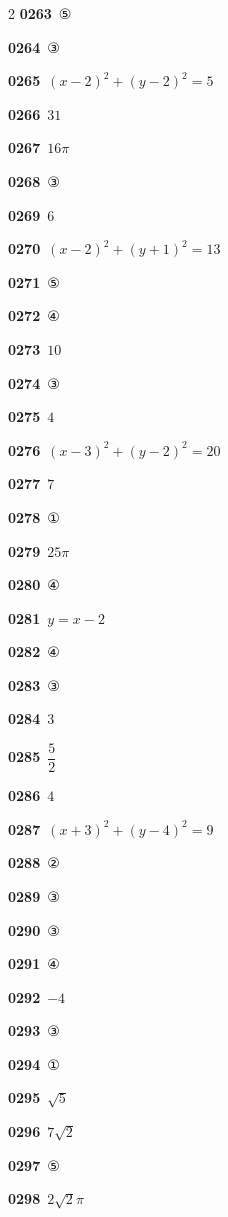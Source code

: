 \documentclass[10pt,a4paper]{article}
\begin{document}
\begin{multicols}{2}
\noindent\textbf{0263}\ ⑤\par
\noindent\textbf{0264}\ ③\par
\noindent\textbf{0265}\ $(x-2)^2+(y-2)^2=5$\par
\noindent\textbf{0266}\ $31$\par
\noindent\textbf{0267}\ $16\pi$\par
\noindent\textbf{0268}\ ③\par
\noindent\textbf{0269}\ $6$\par
\noindent\textbf{0270}\ $(x-2)^2+(y+1)^2=13$\par
\noindent\textbf{0271}\ ⑤\par
\noindent\textbf{0272}\ ④\par
\noindent\textbf{0273}\ $10$\par
\noindent\textbf{0274}\ ③\par
\noindent\textbf{0275}\ $4$\par
\noindent\textbf{0276}\ $(x-3)^2+(y-2)^2=20$\par
\noindent\textbf{0277}\ $7$\par
\noindent\textbf{0278}\ ①\par
\noindent\textbf{0279}\ $25\pi$\par
\noindent\textbf{0280}\ ④\par
\noindent\textbf{0281}\ $y=x-2$\par
\noindent\textbf{0282}\ ④\par
\noindent\textbf{0283}\ ③\par
\noindent\textbf{0284}\ $3$\par
\noindent\textbf{0285}\ $\dfrac{5}{2}$\par
\noindent\textbf{0286}\ $4$\par
\noindent\textbf{0287}\ $(x+3)^2+(y-4)^2=9$\par
\noindent\textbf{0288}\ ②\par
\noindent\textbf{0289}\ ③\par
\noindent\textbf{0290}\ ③\par
\noindent\textbf{0291}\ ④\par
\noindent\textbf{0292}\ $-4$\par
\noindent\textbf{0293}\ ③\par
\noindent\textbf{0294}\ ①\par
\noindent\textbf{0295}\ $\sqrt{5}$\par
\noindent\textbf{0296}\ $7\sqrt{2}$\par
\noindent\textbf{0297}\ ⑤\par
\noindent\textbf{0298}\ $2\sqrt{2}\pi$\par

\end{multicols}
\end{document}
